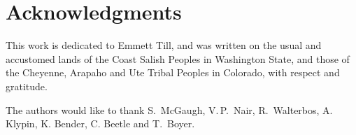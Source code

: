 \documentclass[reprint,%
 amsmath,amssymb,
 aps,
]{revtex4-1}
\begin{document}


   

  \section[]{Acknowledgments}
 This work is dedicated to Emmett Till, and was written on the usual and accustomed lands of the Coast Salish Peoples in Washington State, and those of the Cheyenne, Arapaho and Ute Tribal Peoples in Colorado, with    respect and gratitude.

  The authors would like to thank  S.\ McGaugh,  V.\,P.\,  Nair,   R.\, Walterbos,  A.\, Klypin, K. Bender, C. Beetle and     T.\, Boyer.   \\
  
 
\end{document}
